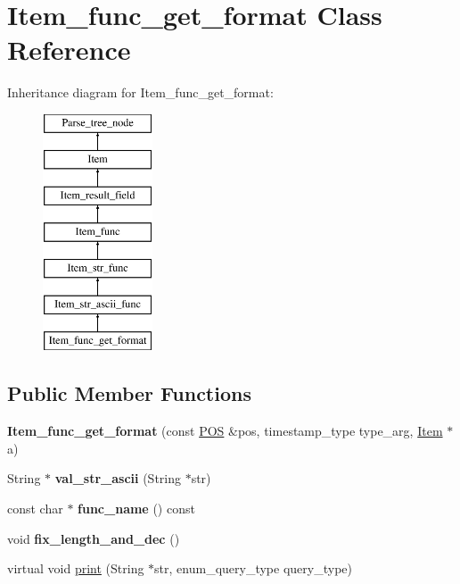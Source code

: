 \hypertarget{classItem__func__get__format}{}\section{Item\+\_\+func\+\_\+get\+\_\+format Class Reference}
\label{classItem__func__get__format}
Inheritance diagram for Item\+\_\+func\+\_\+get\+\_\+format\+:\begin{figure}[H]
\begin{center}
\leavevmode
\includegraphics[height=7.000000cm]{classItem__func__get__format}
\end{center}
\end{figure}
\subsection*{Public Member Functions}
\begin{DoxyCompactItemize}
\item 
\mbox{\label{classItem__func__get__format_a8f13c08ede9834656e566db474ac04d0}} 
{\bfseries Item\+\_\+func\+\_\+get\+\_\+format} (const \mbox{\hyperlink{structYYLTYPE}{P\+OS}} \&pos, timestamp\+\_\+type type\+\_\+arg, \mbox{\hyperlink{classItem}{Item}} $\ast$a)
\item 
\mbox{\label{classItem__func__get__format_acaa501cd4b8e2762d713ca8d1d675992}} 
String $\ast$ {\bfseries val\+\_\+str\+\_\+ascii} (String $\ast$str)
\item 
\mbox{\label{classItem__func__get__format_a1771a5bed3c08d9384772ebcf5211fc5}} 
const char $\ast$ {\bfseries func\+\_\+name} () const
\item 
\mbox{\label{classItem__func__get__format_a8ea71517d3f2ef09fd00ecec7339a618}} 
void {\bfseries fix\+\_\+length\+\_\+and\+\_\+dec} ()
\item 
virtual void \mbox{\hyperlink{classItem__func__get__format_a9de8cf490a3cdfbef5f1c7e42e0d20f2}{print}} (String $\ast$str, enum\+\_\+query\+\_\+type query\+\_\+type)
\end{DoxyCompactItemize}

